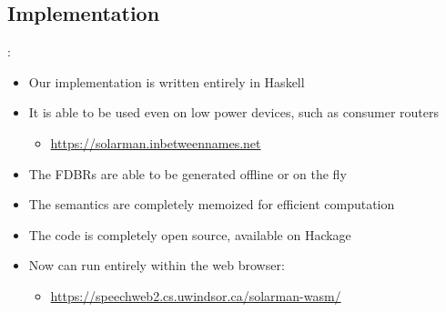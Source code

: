 \documentclass[logoontitle,tabu,supertabular,aspectratio=43]{preney-uwindsor-beamer}
\begin{document}
    \subsection{Implementation}
	\begin{frame}{\insertsection: \insertsubsection}
		\begin{itemize}
			\item Our implementation is written entirely in Haskell
			\item It is able to be used even on low power devices, such as consumer routers
			\begin{itemize}
				\item \url{https://solarman.inbetweennames.net}
			\end{itemize}
			\item The FDBRs are able to be generated offline or on the fly
			\item The semantics are completely memoized for efficient computation
			\item The code is completely open source, available on Hackage \cite{xsaiga}
            \item Now can run entirely within the web browser:
            \begin{itemize}
                \item \url{https://speechweb2.cs.uwindsor.ca/solarman-wasm/}
            \end{itemize}
		\end{itemize}
	\end{frame}
\end{document}
